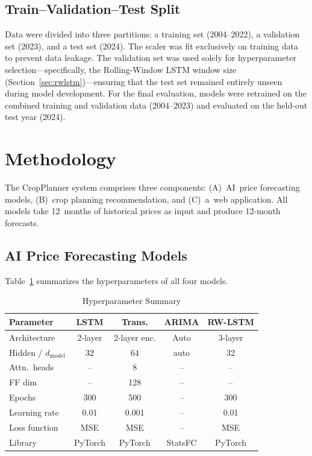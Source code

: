 \documentclass[conference]{IEEEtran}
\begin{document}
\subsection{Train--Validation--Test Split}

Data were divided into three partitions: a training set (2004--2022), a validation set (2023), and a test set (2024). The scaler was fit exclusively on training data to prevent data leakage. The validation set was used solely for hyperparameter selection---specifically, the Rolling-Window LSTM window size (Section~\ref{sec:rwlstm})---ensuring that the test set remained entirely unseen during model development. For the final evaluation, models were retrained on the combined training and validation data (2004--2023) and evaluated on the held-out test year (2024).


\section{Methodology}

The CropPlanner system comprises three components: (A)~AI~price forecasting models, (B)~crop planning recommendation, and (C)~a~web application. All models take 12~months of historical prices as input and produce 12-month forecasts.

\subsection{AI Price Forecasting Models}

Table~\ref{tab:hyperparams} summarizes the hyperparameters of all four models.

\begin{table}[htbp]
  \centering
  \caption{Hyperparameter Summary}
  \label{tab:hyperparams}
  \begin{tabular}{lcccc}
    \toprule
    \textbf{Parameter} & \textbf{LSTM} & \textbf{Trans.} & \textbf{ARIMA} & \textbf{RW-LSTM} \\
    \midrule
    Architecture & 2-layer & 2-layer enc. & Auto & 3-layer \\
    Hidden / $d_{\text{model}}$ & 32 & 64 & auto & 32 \\
    Attn.\ heads & -- & 8 & -- & -- \\
    FF dim & -- & 128 & -- & -- \\
    Epochs & 300 & 500 & -- & 300 \\
    Learning rate & 0.01 & 0.001 & -- & 0.01 \\
    Loss function & MSE & MSE & -- & MSE \\
    Library & PyTorch & PyTorch & StatsFC & PyTorch \\
    \bottomrule
  \end{tabular}
\end{table}
\end{document}
